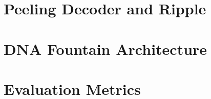 \section{Peeling Decoder and Ripple}
\label{sec:peeling_decoder_and_ripple}

\section{DNA Fountain Architecture}
\label{sec:dna_fountain_architecture}

\section{Evaluation Metrics}
\label{sec:evaluation_metrics}
